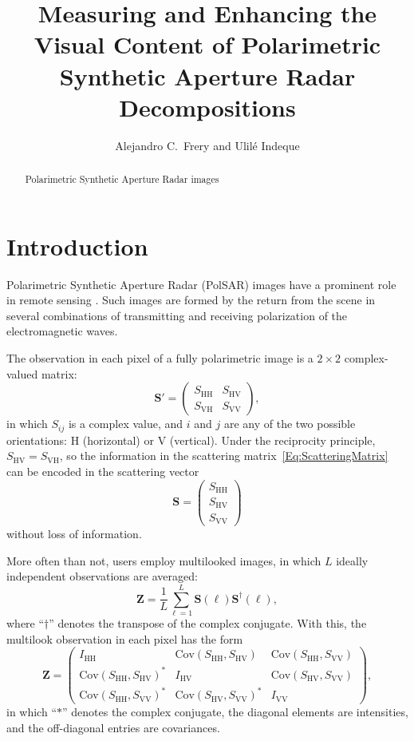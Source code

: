 \documentclass[12pt]{article}
\title{Measuring and Enhancing the Visual Content of Polarimetric Synthetic Aperture Radar Decompositions}
\author{Alejandro C.\ Frery and Ulil\'e Indeque}
\date{}
\begin{document}
\maketitle
\begin{abstract}
Polarimetric Synthetic Aperture Radar images
\end{abstract}

\section{Introduction}

Polarimetric Synthetic Aperture Radar (PolSAR) images have a prominent role in remote sensing \citep{PolarisationApplicationsRemoteSensing,LeePottier2009PolarimetricRadarImaging}.
Such images are formed by the return from the scene in several combinations of transmitting and receiving polarization of the electromagnetic waves.

The observation in each pixel of a fully polarimetric image is a $2\times2$ complex-valued matrix:
\begin{equation}
\bm S' = \begin{pmatrix}
	S_{\text{HH}} & S_{\text{HV}}\\
	S_{\text{VH}} & S_{\text{VV}}
\end{pmatrix}, \label{Eq:ScatteringMatrix}
\end{equation}
in which $S_{ij}$ is a complex value, and $i$ and $j$ are any of the two possible orientations: $\text{H}$ (horizontal) or $\text{V}$ (vertical).
Under the reciprocity principle, $S_{\text{HV}}=S_{\text{VH}}$, so the information in the scattering matrix~\eqref{Eq:ScatteringMatrix} can be encoded in the scattering vector
\begin{equation}
\bm S = \begin{pmatrix}
	S_{\text{HH}}\\
	S_{\text{HV}}\\
	S_{\text{VV}}
\end{pmatrix}
\end{equation}
without loss of information.

More often than not, users employ multilooked images, in which $L$ ideally independent observations are averaged:
\begin{equation}
\bm Z = \frac{1}{L} \sum_{\ell=1}^L \bm S(\ell) \bm S^\dag(\ell),
\end{equation}
where ``$\dag$'' denotes the transpose of the complex conjugate.
With this, the multilook observation in each pixel has the form
\begin{equation}
\bm Z = \begin{pmatrix}
I_{\text{HH}} & \text{Cov}(S_{\text{HH}},S_\text{HV}) & \text{Cov}(S_{\text{HH}},S_\text{VV}) \\
\text{Cov}(S_{\text{HH}},S_\text{HV})^* & I_{\text{HV}} & \text{Cov}(S_{\text{HV}},S_\text{VV})\\
\text{Cov}(S_{\text{HH}},S_\text{VV})^* & \text{Cov}(S_{\text{HV}},S_\text{VV})^* & I_{\text{VV}}
\end{pmatrix},
\label{Eq:Multilook}
\end{equation}
in which ``$*$'' denotes the complex conjugate, the diagonal elements are intensities, and the off-diagonal entries are covariances.
\end{document}

